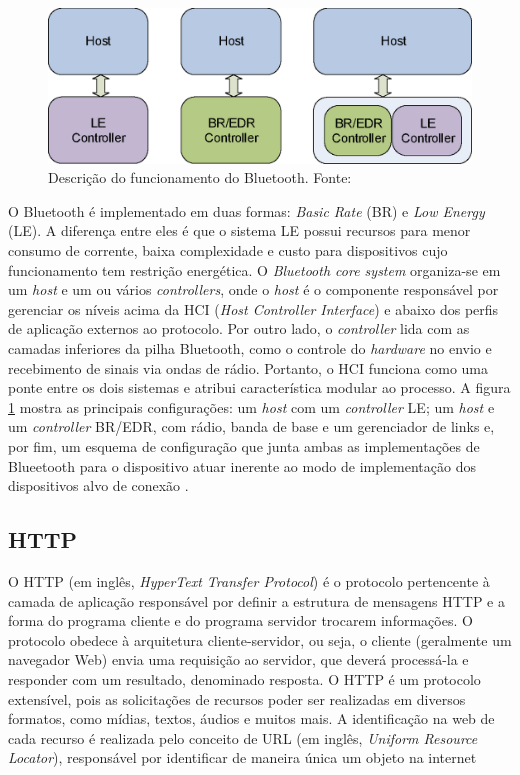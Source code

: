 \begin{figure}[ht]
    \centering
    \includegraphics[width=.48\textwidth]{img/blueetooth-comunication.png}
    \caption{Descrição do funcionamento do Bluetooth. Fonte:\cite{bluetoothDocumentation}}\label{figBluetooth}
\end{figure}

O Bluetooth é implementado em duas formas: \textit{Basic Rate} (BR) e \textit{Low Energy} (LE). A diferença entre eles é que o sistema LE
possui recursos para menor consumo de corrente, baixa complexidade e custo para dispositivos cujo funcionamento tem restrição energética. O \textit{Bluetooth core system} 
organiza-se em um \textit{host} e um ou vários \textit{controllers}, onde o \textit{host} é o componente responsável 
por gerenciar os níveis acima da HCI (\textit{Host Controller Interface}) e abaixo dos perfis de aplicação externos ao protocolo. Por outro lado, o \textit{controller} 
lida com as camadas inferiores da pilha Bluetooth, como o controle do \textit{hardware} no envio e recebimento de sinais via ondas de rádio. Portanto, o 
HCI funciona como uma ponte entre os dois sistemas e atribui característica modular ao processo. A figura \ref{figBluetooth} mostra as principais configurações: um \textit{host} com um \textit{controller} LE; 
um \textit{host} e um \textit{controller} BR/EDR, com rádio, banda de base e um gerenciador de links e, por fim, um esquema de configuração que junta ambas as implementações de Blueetooth para o dispositivo atuar inerente 
ao modo de implementação dos dispositivos alvo de conexão \cite{bluetoothDocumentation}.

\subsection{HTTP}

O HTTP (em inglês, \textit{HyperText Transfer Protocol}) é o protocolo pertencente à camada de aplicação responsável por definir a estrutura de mensagens HTTP e a forma do programa cliente e do programa servidor 
trocarem informações. O protocolo obedece à arquitetura cliente-servidor, ou seja, o cliente (geralmente um navegador Web) envia uma requisição ao servidor, que deverá processá-la e responder com um resultado, denominado resposta. O HTTP é um protocolo extensível, pois 
as solicitações de recursos poder ser realizadas em diversos formatos, como mídias, textos, áudios e muitos mais. A identificação na web de cada recurso é realizada pelo conceito de URL (em inglês, \textit{Uniform Resource Locator}), responsável por identificar de maneira única um objeto na internet \cite[pp. 72]{redeskurose2010}

